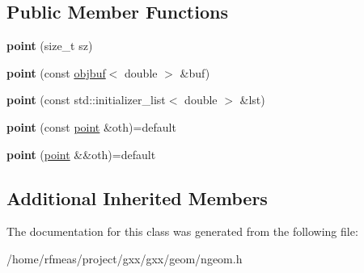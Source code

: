 \subsection*{Public Member Functions}
\begin{DoxyCompactItemize}
\item 
{\bfseries point} (size\+\_\+t sz)\hypertarget{classgxx_1_1ngeom_1_1point_a8ffb9866ad23a050bfecebb4cfcf7dc0}{}\label{classgxx_1_1ngeom_1_1point_a8ffb9866ad23a050bfecebb4cfcf7dc0}

\item 
{\bfseries point} (const \hyperlink{classgxx_1_1object__buffer}{objbuf}$<$ double $>$ \&buf)\hypertarget{classgxx_1_1ngeom_1_1point_add7397d994402da5670e8717c496f00f}{}\label{classgxx_1_1ngeom_1_1point_add7397d994402da5670e8717c496f00f}

\item 
{\bfseries point} (const std\+::initializer\+\_\+list$<$ double $>$ \&lst)\hypertarget{classgxx_1_1ngeom_1_1point_a04a1dad37c8033c46b54973e42e61ad3}{}\label{classgxx_1_1ngeom_1_1point_a04a1dad37c8033c46b54973e42e61ad3}

\item 
{\bfseries point} (const \hyperlink{classgxx_1_1ngeom_1_1point}{point} \&oth)=default\hypertarget{classgxx_1_1ngeom_1_1point_acecd973fac576f91d5fa923d9b2ccb45}{}\label{classgxx_1_1ngeom_1_1point_acecd973fac576f91d5fa923d9b2ccb45}

\item 
{\bfseries point} (\hyperlink{classgxx_1_1ngeom_1_1point}{point} \&\&oth)=default\hypertarget{classgxx_1_1ngeom_1_1point_ace5c7f030015b4b3cb8ce33e563f26bc}{}\label{classgxx_1_1ngeom_1_1point_ace5c7f030015b4b3cb8ce33e563f26bc}

\end{DoxyCompactItemize}
\subsection*{Additional Inherited Members}


The documentation for this class was generated from the following file\+:\begin{DoxyCompactItemize}
\item 
/home/rfmeas/project/gxx/gxx/geom/ngeom.\+h\end{DoxyCompactItemize}
